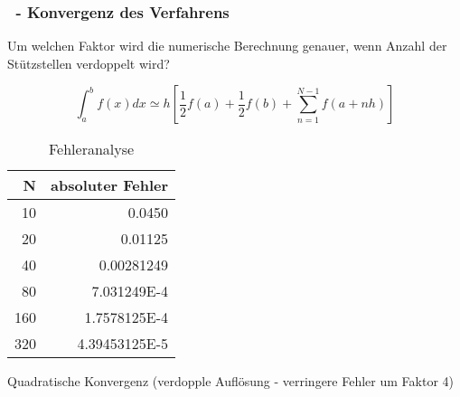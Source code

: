 \begin{frame}[t]%
  \frametitle{\theexercise\ - Konvergenz des Verfahrens}%
Um welchen Faktor wird die numerische Berechnung genauer, wenn Anzahl der Stützstellen verdoppelt wird?

\begin{equation*}
\int_a^b f(x)dx
\simeq
h \left[\frac{1}{2}f(a)+\frac{1}{2}f(b)+\sum_{n=1}^{N-1}f\left(a+nh \right)\right]
\end{equation*}

\begin{table}
\caption{Fehleranalyse}
\begin{tabular}{r|r}
N   & absoluter Fehler \\ \hline \hline
10  &  0.0450\\
20  &  0.01125\\
40  &  0.00281249\\
80  &  7.031249E-4\\
160 &  1.7578125E-4\\
320 &  4.39453125E-5\\
\end{tabular}
\end{table}
\hfill

Quadratische Konvergenz  (verdopple Auflösung - verringere Fehler um Faktor 4)
\end{frame}
